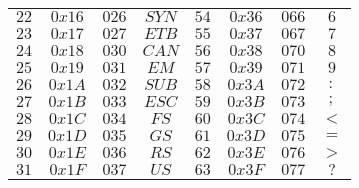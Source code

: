 \documentclass[10pt,a5paper]{report}
\begin{document}
\begin{longtable}{|c|c|c|c||c|c|c|c|}
       $ 22 $&$ 0x16 $&$ 026 $&$ SYN $&$ 54 $&$ 0x36 $&$ 066 $&$ 6 $\\
       $ 23 $&$ 0x17 $&$ 027 $&$ ETB $&$ 55 $&$ 0x37 $&$ 067 $&$ 7 $\\
       $ 24 $&$ 0x18 $&$ 030 $&$ CAN $&$ 56 $&$ 0x38 $&$ 070 $&$ 8 $\\
       $ 25 $&$ 0x19 $&$ 031 $&$ EM $&$ 57 $&$ 0x39 $&$ 071 $&$ 9 $\\
       $ 26 $&$ 0x1A $&$ 032 $&$ SUB $&$ 58 $&$ 0x3A $&$ 072 $&$ : $\\
       $ 27 $&$ 0x1B $&$ 033 $&$ ESC $&$ 59 $&$ 0x3B $&$ 073 $&$ ; $\\
       $ 28 $&$ 0x1C $&$ 034 $&$ FS $&$ 60 $&$ 0x3C $&$ 074 $&$ < $\\
       $ 29 $&$ 0x1D $&$ 035 $&$ GS $&$ 61 $&$ 0x3D $&$ 075 $&$ = $\\
       $ 30 $&$ 0x1E $&$ 036 $&$ RS $&$ 62 $&$ 0x3E $&$ 076 $&$ > $\\
       $ 31 $&$ 0x1F $&$ 037 $&$ US $&$ 63 $&$ 0x3F $&$ 077 $&$ ? $\\
    \hline
    \end{longtable}
    
\end{document}
